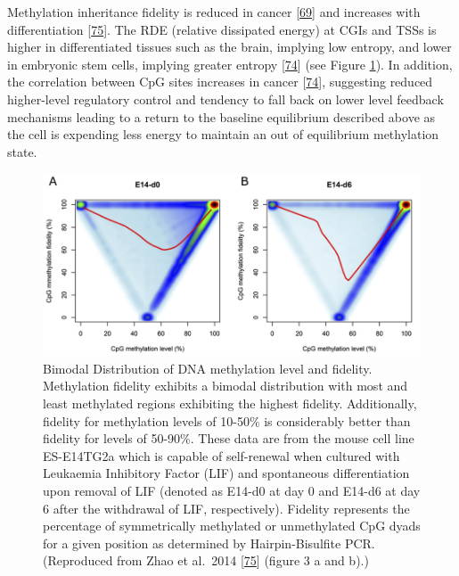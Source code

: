 \documentclass[
]{book}
\begin{document}
Methylation inheritance fidelity is reduced in cancer {[}\protect\hyperlink{ref-Ushijima2005}{69}{]} and increases with differentiation {[}\protect\hyperlink{ref-Zhao2014}{75}{]}.
The RDE (relative dissipated energy) at CGIs and TSSs is higher in differentiated tissues such as the brain, implying low entropy, and lower in embryonic stem cells, implying greater entropy {[}\protect\hyperlink{ref-Jenkinson2017}{74}{]} (see Figure \ref{fig:Zhao2014fig3ab}).
In addition, the correlation between CpG sites increases in cancer {[}\protect\hyperlink{ref-Jenkinson2017}{74}{]}, suggesting reduced higher-level regulatory control and tendency to fall back on lower level feedback mechanisms leading to a return to the baseline equilibrium described above as the cell is expending less energy to maintain an out of equilibrium methylation state.

\begin{figure}

{\centering \includegraphics[width=0.8\linewidth]{figs/Zhao2014-fig3-ab} 

}

\caption{Bimodal Distribution of DNA methylation level and fidelity. Methylation fidelity exhibits a bimodal distribution with most and least methylated regions exhibiting the highest fidelity. Additionally, fidelity for methylation levels of 10-50\% is considerably better than fidelity for levels of 50-90\%. These data are from the mouse cell line ES-E14TG2a which is capable of self-renewal when cultured with Leukaemia Inhibitory Factor (LIF) and spontaneous differentiation upon removal of LIF (denoted as E14-d0 at day 0 and E14-d6 at day 6 after the withdrawal of LIF, respectively). Fidelity represents the percentage of symmetrically methylated or unmethylated CpG dyads for a given position as determined by Hairpin-Bisulfite PCR. (Reproduced from Zhao et al.~2014 {[}\protect\hyperlink{ref-Zhao2014}{75}{]} (figure 3 a and b).)}\label{fig:Zhao2014fig3ab}
\end{figure}
\end{document}

